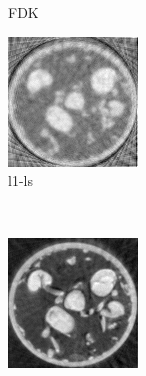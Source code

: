 \documentclass{article}
\begin{document}
\begin{figure}[!h]
\begin{subfigure}[b]{0.4\linewidth}
        \caption{FDK}
    \end{subfigure}
\quad
    \begin{subfigure}[b]{0.4\linewidth}
        \includegraphics[width=\textwidth]{../images/sprouts/csIm.png}
        \caption{l1-ls}
     \end{subfigure}\\
\quad
    \begin{subfigure}[b]{0.4\linewidth}
        \includegraphics[width=\textwidth]{../images/sprouts/plainPriorIm.png}

\end{subfigure}
\end{figure}
\end{document}

